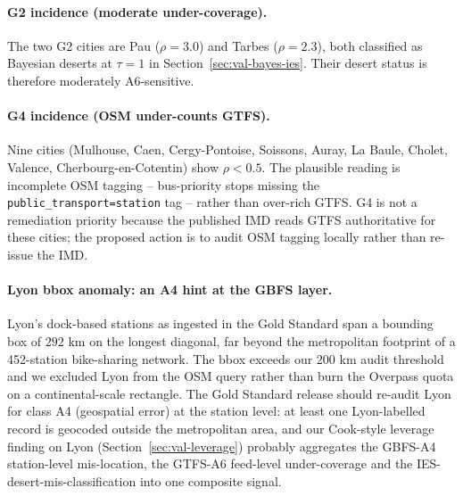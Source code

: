 \documentclass[11pt,a4paper]{article}
\begin{document}
\paragraph{G2 incidence (moderate under-coverage).}
The two G2 cities are Pau ($\rho = 3.0$) and Tarbes ($\rho =
2.3$), both classified as Bayesian deserts at $\tau = 1$ in
Section~\ref{sec:val-bayes-ies}. Their desert status is therefore
moderately A6-sensitive.

\paragraph{G4 incidence (OSM under-counts GTFS).}
Nine cities (Mulhouse, Caen, Cergy-Pontoise, Soissons, Auray, La
Baule, Cholet, Valence, Cherbourg-en-Cotentin) show
$\rho < 0.5$. The plausible reading is incomplete OSM tagging --
bus-priority stops missing the \texttt{public\_transport=station}
tag -- rather than over-rich GTFS. G4 is not a remediation
priority because the published IMD reads GTFS authoritative for
these cities; the proposed action is to audit OSM tagging
locally rather than re-issue the IMD.

\paragraph{Lyon bbox anomaly: an A4 hint at the GBFS layer.}
Lyon's dock-based stations as ingested in the Gold Standard span
a bounding box of $292$ km on the longest diagonal, far beyond
the metropolitan footprint of a 452-station bike-sharing network.
The bbox exceeds our $200$ km audit threshold and we excluded
Lyon from the OSM query rather than burn the Overpass quota on
a continental-scale rectangle. The Gold Standard release should
re-audit Lyon for class A4 (geospatial error) at the station
level: at least one Lyon-labelled record is geocoded outside the
metropolitan area, and our Cook-style leverage finding on Lyon
(Section~\ref{sec:val-leverage}) probably aggregates the
GBFS-A4 station-level mis-location, the GTFS-A6 feed-level
under-coverage and the IES-desert-mis-classification into one
composite signal.
\end{document}

